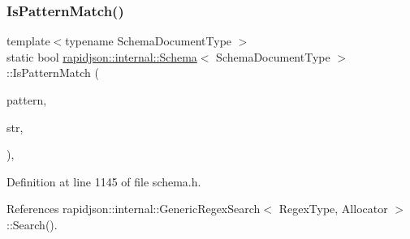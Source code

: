 \subsubsection{\texorpdfstring{IsPatternMatch()}{IsPatternMatch()}}
{\footnotesize\ttfamily template$<$typename Schema\+Document\+Type $>$ \\
static bool \mbox{\hyperlink{classrapidjson_1_1internal_1_1_schema}{rapidjson\+::internal\+::\+Schema}}$<$ Schema\+Document\+Type $>$\+::Is\+Pattern\+Match (\begin{DoxyParamCaption}\item[{const \mbox{\hyperlink{classrapidjson_1_1internal_1_1_schema_a2c16b06523df78f5c354e9a68da90e23}{Regex\+Type}} $\ast$}]{pattern,  }\item[{const \mbox{\hyperlink{classrapidjson_1_1internal_1_1_schema_ab9093cbc42067b8e1d3745eafe096ab3}{Ch}} $\ast$}]{str,  }\item[{\mbox{\hyperlink{namespacerapidjson_a44eb33eaa523e36d466b1ced64b85c84}{Size\+Type}}}]{ }\end{DoxyParamCaption})\hspace{0.3cm}{\ttfamily [static]}, {\ttfamily [private]}}



Definition at line 1145 of file schema.\+h.


\begin{DoxyCode}{0}

\end{DoxyCode}


References rapidjson\+::internal\+::\+Generic\+Regex\+Search$<$ Regex\+Type, Allocator $>$\+::\+Search().

\mbox{\label{classrapidjson_1_1internal_1_1_schema_a815c23a7b366bfb92b07574423c045c1}} 
